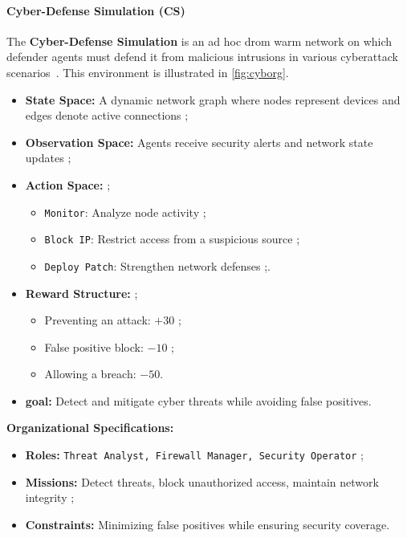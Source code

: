 \documentclass[pdflatex,sn-mathphys-num]{sn-jnl}%
\theoremstyle{thmstyleone}%
\theoremstyle{thmstyletwo}%
\theoremstyle{thmstylethree}%
\begin{document}
\paragraph{Cyber-Defense Simulation (CS)}
The \textbf{Cyber-Defense Simulation} is an ad hoc drom warm network on which defender agents must defend it from malicious intrusions in various cyberattack scenarios~\cite{Standen2021}. This environment is illustrated in \autoref{fig:cyborg}.

\begin{itemize}
    \item \textbf{State Space:} A dynamic network graph where nodes represent devices and edges denote active connections ;
    \item \textbf{Observation Space:} Agents receive security alerts and network state updates ;
    \item \textbf{Action Space:}  ;
          \begin{itemize}
              \item \texttt{Monitor}: Analyze node activity ;
              \item \texttt{Block IP}: Restrict access from a suspicious source ;
              \item \texttt{Deploy Patch}: Strengthen network defenses ;.
          \end{itemize}
    \item \textbf{Reward Structure:} ;
          \begin{itemize}
              \item Preventing an attack: $+30$ ;
              \item False positive block: $-10$ ;
              \item Allowing a breach: $-50$.
          \end{itemize}
    \item \textbf{goal:} Detect and mitigate cyber threats while avoiding false positives.
\end{itemize}

\textbf{Organizational Specifications:}
\begin{itemize}
    \item \textbf{Roles:} \texttt{Threat Analyst, Firewall Manager, Security Operator} ;
    \item \textbf{Missions:} Detect threats, block unauthorized access, maintain network integrity ;
    \item \textbf{Constraints:} Minimizing false positives while ensuring security coverage.
\end{itemize}
\end{document}

